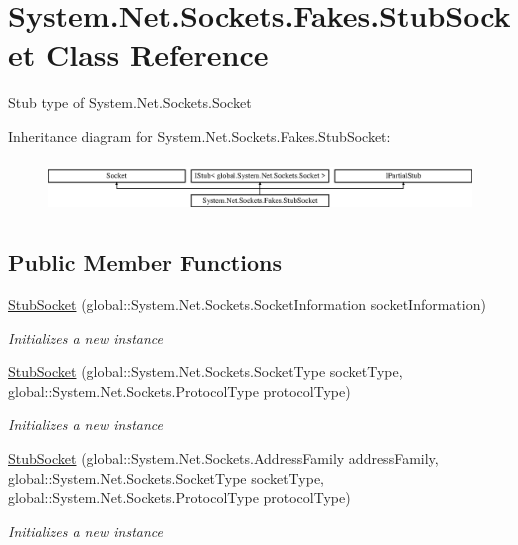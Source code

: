 \hypertarget{class_system_1_1_net_1_1_sockets_1_1_fakes_1_1_stub_socket}{\section{System.\-Net.\-Sockets.\-Fakes.\-Stub\-Socket Class Reference}
\label{class_system_1_1_net_1_1_sockets_1_1_fakes_1_1_stub_socket}
}


Stub type of System.\-Net.\-Sockets.\-Socket 


Inheritance diagram for System.\-Net.\-Sockets.\-Fakes.\-Stub\-Socket\-:\begin{figure}[H]
\begin{center}
\leavevmode
\includegraphics[height=1.419518cm]{class_system_1_1_net_1_1_sockets_1_1_fakes_1_1_stub_socket}
\end{center}
\end{figure}
\subsection*{Public Member Functions}
\begin{DoxyCompactItemize}
\item 
\hyperlink{class_system_1_1_net_1_1_sockets_1_1_fakes_1_1_stub_socket_af31e18f5dccdcb7dbb6c5fbcb50c5c88}{Stub\-Socket} (global\-::\-System.\-Net.\-Sockets.\-Socket\-Information socket\-Information)
\begin{DoxyCompactList}\small\item\em Initializes a new instance\end{DoxyCompactList}\item 
\hyperlink{class_system_1_1_net_1_1_sockets_1_1_fakes_1_1_stub_socket_adb4277ca2e9c0974190f4b588060103a}{Stub\-Socket} (global\-::\-System.\-Net.\-Sockets.\-Socket\-Type socket\-Type, global\-::\-System.\-Net.\-Sockets.\-Protocol\-Type protocol\-Type)
\begin{DoxyCompactList}\small\item\em Initializes a new instance\end{DoxyCompactList}\item 
\hyperlink{class_system_1_1_net_1_1_sockets_1_1_fakes_1_1_stub_socket_a11ffee4656407ef948dc53216edbbbab}{Stub\-Socket} (global\-::\-System.\-Net.\-Sockets.\-Address\-Family address\-Family, global\-::\-System.\-Net.\-Sockets.\-Socket\-Type socket\-Type, global\-::\-System.\-Net.\-Sockets.\-Protocol\-Type protocol\-Type)
\begin{DoxyCompactList}\small\item\em Initializes a new instance\end{DoxyCompactList}\end{DoxyCompactItemize}
